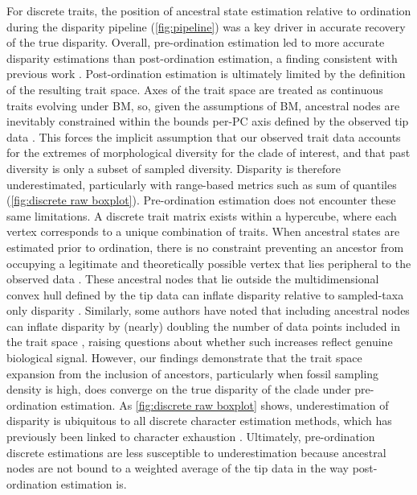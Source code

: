 \documentclass[11pt, a4paper]{article}
\newcommand{\ase}{ancestral state estimation }
\begin{document}
For discrete traits, the position of \ase relative to ordination during the disparity pipeline (\autoref{fig:pipeline}) was a key driver in accurate recovery of the true disparity.
Overall, pre-ordination estimation led to more accurate disparity estimations than post-ordination estimation, a finding consistent with previous work  \citep{lloyd2018journeys}.
Post-ordination estimation is ultimately limited by the definition of the resulting trait space.
Axes of the trait space are treated as continuous traits evolving under BM, so, given the assumptions of BM, ancestral nodes are inevitably constrained within the bounds per-PC axis defined by the observed tip data \citep{stayton2015definition,lloyd2018journeys,gerber2019use}.
This forces the implicit assumption that our observed trait data accounts for the extremes of morphological diversity for the clade of interest, and that past diversity is only a subset of sampled diversity.
Disparity is therefore underestimated, particularly with range-based metrics such as sum of quantiles (\autoref{fig:discrete raw boxplot}).
Pre-ordination estimation does not encounter these same limitations.
A discrete trait matrix exists within a hypercube, where each vertex corresponds to a unique combination of traits.
When ancestral states are estimated prior to ordination, there is no constraint preventing an ancestor from occupying a legitimate and theoretically possible vertex that lies peripheral to the observed data \citep{gerber2019use}.
These ancestral nodes that lie outside the multidimensional convex hull defined by the tip data can inflate disparity relative to sampled-taxa only disparity \citep{brusatte2011phylogenetic}.
Similarly, some authors have noted that including ancestral nodes can inflate disparity by (nearly) doubling the number of data points included in the trait space \citep{brusatte2011phylogenetic}, raising questions about whether such increases reflect genuine biological signal.
However, our findings demonstrate that the trait space expansion from the inclusion of ancestors, particularly when fossil sampling density is high, does converge on the true disparity of the clade under pre-ordination estimation.
As \autoref{fig:discrete raw boxplot} shows, underestimation of disparity is ubiquitous to all discrete character estimation methods, which has previously been linked to character exhaustion \citep{wagner2000exhaustion,erwin_disparity_2007}.
Ultimately, pre-ordination discrete estimations are less susceptible to underestimation because ancestral nodes are not bound to a weighted average of the tip data in the way post-ordination estimation is.
\end{document}
